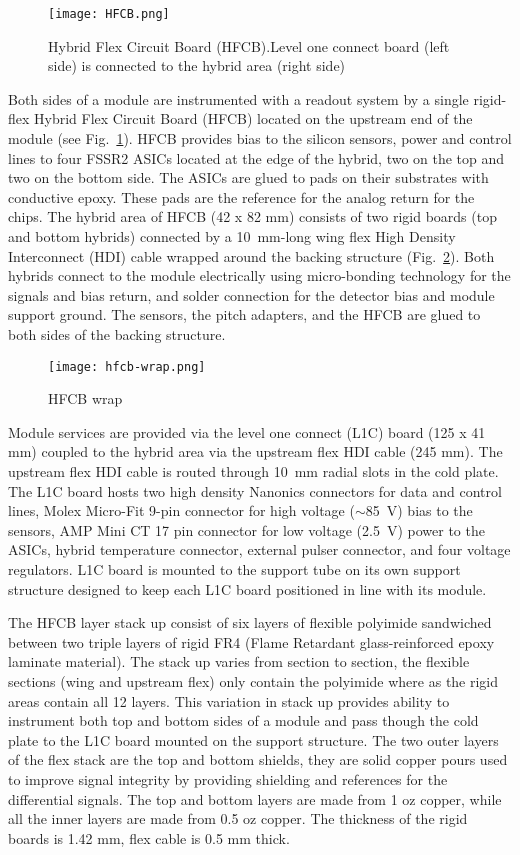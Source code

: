 \begin{figure}[hbt] 
\centering 
\texttt{[image: HFCB.png]}
\caption{Hybrid Flex Circuit Board (HFCB).Level one connect board (left side) is connected to the hybrid area (right side)}
\label{fig:HFCB}
\end{figure}

Both sides of a module are instrumented with a readout system by a single rigid-flex Hybrid Flex Circuit Board (HFCB) located on the upstream end of the module (see Fig.~\ref{fig:HFCB}). HFCB provides bias to the silicon sensors, power and control lines to four FSSR2 ASICs located at the edge of the hybrid, two on the top and two on the bottom side. The ASICs are glued to pads on their substrates with conductive epoxy. These pads are the reference for the analog return for the chips. The hybrid area of HFCB (42 x 82 mm) consists of two rigid boards (top and bottom hybrids) connected by a 10~mm-long wing flex High Density Interconnect (HDI) cable wrapped around the backing structure (Fig.~\ref{fig:hfcb-wrap}). Both hybrids connect to the module electrically using micro-bonding technology for the signals and bias return, and solder connection for the detector bias and module support ground. The sensors, the pitch adapters, and the HFCB are glued to both sides of the backing structure. 

\begin{figure}[hbt] 
\centering 
\texttt{[image: hfcb-wrap.png]}
\caption{HFCB wrap}
\label{fig:hfcb-wrap}
\end{figure}

Module services are provided via the level one connect (L1C) board (125 x 41 mm) coupled to the hybrid area via the upstream flex HDI cable (245 mm). The upstream flex HDI cable is routed through 10~mm radial slots in the cold plate. The L1C board hosts two high density Nanonics connectors for data and control lines, Molex Micro-Fit 9-pin connector for high voltage ($\sim$85~V) bias to the sensors, AMP Mini CT 17 pin connector for low voltage (2.5~V) power to the ASICs, hybrid temperature connector, external pulser connector, and four voltage regulators. L1C board is mounted to the support tube on its own support structure designed to keep each L1C board positioned in line with its module.

The HFCB layer stack up consist of six layers of flexible polyimide sandwiched between two triple layers of rigid FR4 (Flame Retardant glass-reinforced epoxy laminate material). The stack up varies from section to section, the flexible sections (wing and upstream flex) only contain the polyimide where as the rigid areas contain all 12 layers. This variation in stack up provides ability to instrument both top and bottom sides of a module and pass though the cold plate to the L1C board mounted on the support structure. The two outer layers of the flex stack are the top and bottom shields, they are solid copper pours used to improve signal integrity by providing shielding and references for the differential signals. The top and bottom layers are made from 1 oz copper, while all the inner layers are made from 0.5 oz copper. The thickness of the rigid boards is 1.42 mm, flex cable is 0.5 mm thick.

